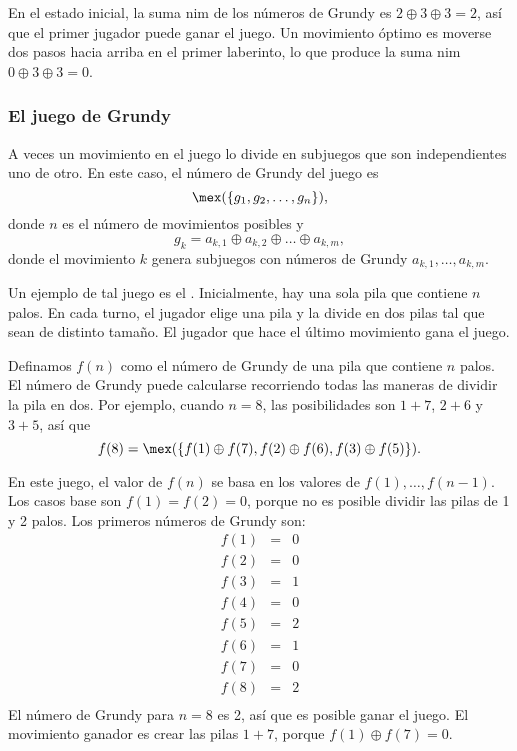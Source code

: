 En el estado inicial, la suma nim de los números de Grundy es
$2 \oplus 3 \oplus 3 = 2$, así que el primer jugador puede ganar el juego.
Un movimiento óptimo es moverse dos pasos hacia arriba en el primer
laberinto, lo que produce la suma nim $0 \oplus 3 \oplus 3 = 0$.

\subsubsection{El juego de Grundy}

A veces un movimiento en el juego lo divide en subjuegos que son
independientes uno de otro. En este caso, el número de Grundy del juego es
\[\mex(\{g_1, g_2, \ldots, g_n \}),\] donde $n$ es el número de
movimientos posibles y
\[g_k = a_{k,1} \oplus a_{k,2} \oplus \ldots \oplus a_{k,m},\]
donde el movimiento $k$ genera subjuegos con números de Grundy
$a_{k,1},\ldots,a_{k,m}$.


Un ejemplo de tal juego es el . Inicialmente, hay
una sola pila que contiene $n$ palos. En cada turno, el jugador elige
una pila y la divide en dos pilas tal que sean de distinto tamaño. El
jugador que hace el último movimiento gana el juego.

Definamos $f(n)$ como el número de Grundy de una pila que contiene $n$
palos. El número de Grundy puede calcularse recorriendo todas las maneras
de dividir la pila en dos. Por ejemplo, cuando $n=8$, las posibilidades
son $1+7$, $2+6$ y $3+5$, así que
\[f(8)=\mex(\{f(1) \oplus f(7), f(2) \oplus f(6), f(3) \oplus f(5)\}).\]

En este juego, el valor de $f(n)$ se basa en los valores de
$f(1),\ldots,f(n-1)$. Los casos base son $f(1)=f(2)=0$, porque no es
posible dividir las pilas de 1 y 2 palos. Los primeros números de Grundy son:
\[
    \begin{array}{lcl}
        f(1) & = & 0 \\
        f(2) & = & 0 \\
        f(3) & = & 1 \\
        f(4) & = & 0 \\
        f(5) & = & 2 \\
        f(6) & = & 1 \\
        f(7) & = & 0 \\
        f(8) & = & 2 \\
    \end{array}
\]
El número de Grundy para $n=8$ es 2, así que es posible ganar el juego.
El movimiento ganador es crear las pilas $1+7$, porque
$f(1) \oplus f(7) = 0$.

